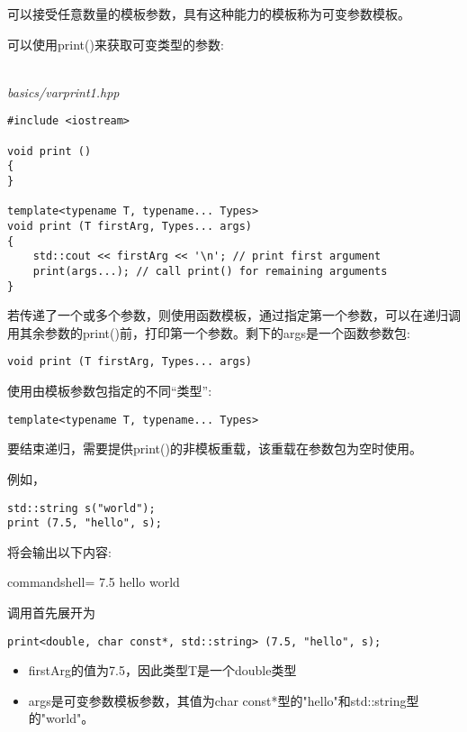 

可以接受任意数量的模板参数，具有这种能力的模板称为可变参数模板。


可以使用print()来获取可变类型的参数:

\hspace*{\fill} \\ %
\noindent
\textit{basics/varprint1.hpp}
\begin{lstlisting}[style=styleCXX]
#include <iostream>

void print ()
{
}

template<typename T, typename... Types>
void print (T firstArg, Types... args)
{
	std::cout << firstArg << '\n'; // print first argument
	print(args...); // call print() for remaining arguments
}
\end{lstlisting}

若传递了一个或多个参数，则使用函数模板，通过指定第一个参数，可以在递归调用其余参数的print()前，打印第一个参数。剩下的args是一个函数参数包:

\begin{lstlisting}[style=styleCXX]
void print (T firstArg, Types... args)
\end{lstlisting}

使用由模板参数包指定的不同“类型”:

\begin{lstlisting}[style=styleCXX]
template<typename T, typename... Types>
\end{lstlisting}

要结束递归，需要提供print()的非模板重载，该重载在参数包为空时使用。

例如，

\begin{lstlisting}[style=styleCXX]
std::string s("world");
print (7.5, "hello", s);
\end{lstlisting}

将会输出以下内容:

\begin{tcblisting}{commandshell={}}
7.5
hello
world
\end{tcblisting}

调用首先展开为

\begin{lstlisting}[style=styleCXX]
print<double, char const*, std::string> (7.5, "hello", s);
\end{lstlisting}

\begin{itemize}
\item 
firstArg的值为7.5，因此类型T是一个double类型

\item 
args是可变参数模板参数，其值为char const*型的"hello"和std::string型的"world"。
\end{itemize}

